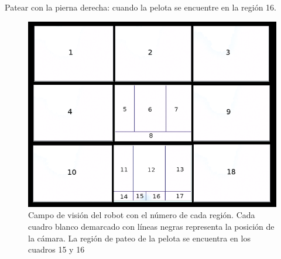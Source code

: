 Patear con la pierna derecha: cuando la pelota se encuentre en la región 16.

\begin{figure}[hbtp]

\centering
\includegraphics[scale=0.3]{imagenes/unnamed.png}
\caption{Campo de visión del robot con el número de cada región. Cada cuadro blanco demarcado con líneas negras representa la posición de la cámara. La región de pateo de la pelota se encuentra en los cuadros 15 y 16 }
\end{figure}
